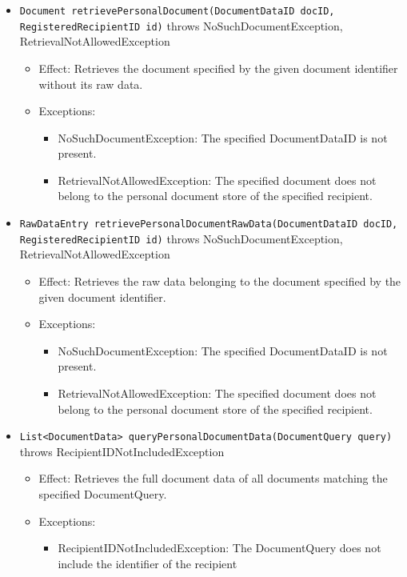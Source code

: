 \documentclass[a4paper,10pt]{article}
\begin{document}
\begin{itemize}
\begin{itemize}
		\item \texttt{Document retrievePersonalDocument(DocumentDataID docID, RegisteredRecipientID id)} throws NoSuchDocumentException, RetrievalNotAllowedException
		\begin{itemize}
			\item Effect: Retrieves the document specified by the given document identifier without its raw data.
			\item Exceptions:
			\begin{itemize}
				\item NoSuchDocumentException: The specified DocumentDataID is not present.
				\item RetrievalNotAllowedException: The specified document does not belong to the personal document store of the specified recipient.
			\end{itemize}
		\end{itemize}
		
		\item \texttt{RawDataEntry retrievePersonalDocumentRawData(DocumentDataID docID, RegisteredRecipientID id)} throws NoSuchDocumentException, RetrievalNotAllowedException
		\begin{itemize}
			\item Effect: Retrieves the raw data belonging to the document specified by the given document identifier.
			\item Exceptions:
			\begin{itemize}
				\item NoSuchDocumentException: The specified DocumentDataID is not present.
				\item RetrievalNotAllowedException: The specified document does not belong to the personal document store of the specified recipient.
			\end{itemize}
		\end{itemize}
		
		\item \texttt{List<DocumentData> queryPersonalDocumentData(DocumentQuery query)} throws RecipientIDNotIncludedException
		\begin{itemize}
			\item Effect: Retrieves the full document data of all documents matching the specified DocumentQuery.
			\item Exceptions:
			\begin{itemize}
				\item RecipientIDNotIncludedException: The DocumentQuery does not include the identifier of the recipient
			\end{itemize}
		\end{itemize}
		

\end{itemize}
\end{itemize}
\end{document}
